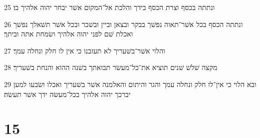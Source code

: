 \par 25 ונתתה בכסף וצרת הכסף בידך והלכת אל־המקום אשׁר יבחר יהוה אלהיך בו׃
\par 26 ונתתה הכסף בכל אשׁר־תאוה נפשׁך בבקר ובצאן וביין ובשׁכר ובכל אשׁר תשׁאלך נפשׁך ואכלת שׁם לפני יהוה אלהיך ושׂמחת אתה וביתך׃
\par 27 והלוי אשׁר־בשׁעריך לא תעזבנו כי אין לו חלק ונחלה עמך׃
\par 28 מקצה שׁלשׁ שׁנים תוציא את־כל־מעשׂר תבואתך בשׁנה ההוא והנחת בשׁעריך׃
\par 29 ובא הלוי כי אין־לו חלק ונחלה עמך והגר והיתום והאלמנה אשׁר בשׁעריך ואכלו ושׂבעו למען יברכך יהוה אלהיך בכל־מעשׂה ידך אשׁר תעשׂה׃

\chapter{15}

